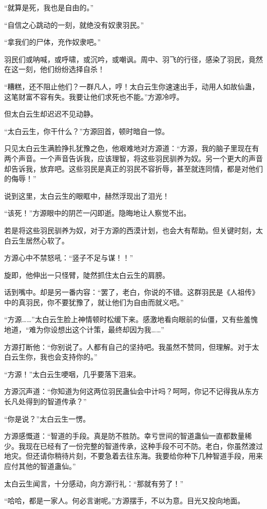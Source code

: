 \begin{this_body}
“就算是死，我也是自由的。”

“自信之心跳动的一刻，就绝没有奴隶羽民。”

“拿我们的尸体，充作奴隶吧。”

羽民们或呐喊，或呼啸，或沉吟，或嘲讽。周中、羽飞的行径，感染了羽民，竟然在这一刻，他们纷纷选择自杀！

“糟糕，还不阻止他们？一群凡人，哼！太白云生你速速出手，动用人如故仙蛊，这笔财富不容有失。我要让他们求死也不能。”方源冷哼。

但太白云生却迟迟不见动静。

“太白云生，你干什么？”方源回首，顿时暗自一惊。

只见太白云生满脸挣扎犹豫之色，他艰难地对方源道：“方源，我的脑子里现在有两个声音。一个声音告诉我，应该理智，将这些羽民驯养为奴。另一个更大的声音却告诉我，放弃吧。这些羽民是真正的羽民不容折辱，甚至就连同情，都是对他们的侮辱！”

说到这里，太白云生的眼眶中，赫然浮现出了泪光！

“该死！”方源眼中的阴芒一闪即逝。隐晦地让人察觉不出。

若是将这些羽民驯养为奴，对于方源的西漠计划，也会大有帮助。但关键时刻，太白云生居然心软了。

方源心中不禁怒吼：“竖子不足与谋！！”

旋即，他伸出一只怪臂，陡然抓住太白云生的肩膀。

话到嘴中。却是另一番内容：“罢了，老白，你说的不错。这群羽民是《人祖传》中的真羽民，你不要犹豫了，就让他们为自由而就义吧。”

“方源……”太白云生脸上神情顿时松缓下来。感激地看向眼前的仙僵，又有些羞愧地道，“难为你设想出这个计策，最终却因为我……”

方源打断他：“你别说了。人都有自己的坚持吧。我虽然不赞同，但理解。对于太白云生你，我也会支持你的。”

“方源！”太白云生哽咽，几乎要落下泪来。

方源沉声道：“你知道为何这两位羽民蛊仙会中计吗？呵呵，你记不记得我从东方长凡处得到的智道传承？”

“你是说？”太白云生一愣。

方源感慨道：“智道的手段。真是防不胜防。幸亏世间的智道蛊仙一直都数量稀少。我现在已经有了一份完整的智道传承，这种手段不可不防。老白，你虽然渡过地灾。但还请你稍待片刻，不要急着去往东海。我要给你种下几种智道手段，用来应付其他的智道蛊仙。”

太白云生闻言，十分感动，向方源行礼：“那就有劳了！”

“哈哈，都是一家人。何必言谢呢。”方源摆手，不以为意。目光又投向地面。


\end{this_body}
